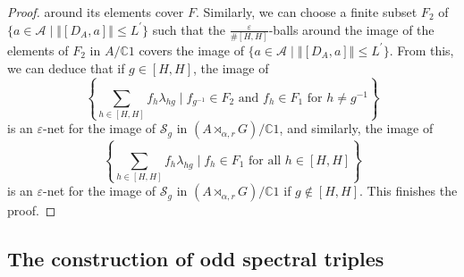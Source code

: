 \documentclass[a4paper,11pt,reqno]{amsart}
\numberwithin{equation}{section}
\numberwithin{equation}{section}
\theoremstyle{definition}
\theoremstyle{remark}
\theoremstyle{remark}
\begin{document}
\begin{proof}
around its elements cover $F$. Similarly, we can choose a finite subset
$F_{2}$ of $\{a\in\mathcal{A}\mid\left\Vert [D_{A},a]\right\Vert \leq L^\prime \}$
such that the $\frac{\varepsilon}{\#[H,H]}$-balls around the image
of the elements of $F_{2}$ in $A/\mathbb{C}1$ covers the image of
$\{a\in\mathcal{A}\mid\left\Vert [D_{A},a]\right\Vert \leq L^\prime\}$. From
this, we can deduce that if $g\in[H,H]$, the image of 
\[
\left\{ \sum_{h\in[H,H]}f_{h}\lambda_{hg}\mid f_{g^{-1}}\in F_{2}\text{ and }f_{h}\in F_{1}\text{ for }h\neq g^{-1}\right\} 
\]
is an $\varepsilon$-net for the image of $\mathcal{S}_{g}$ in $(A\rtimes_{\alpha,r}G)/\mathbb{C}1$,
and similarly, the image of 
\[
\left\{ \sum_{h\in[H,H]}f_{h}\lambda_{hg}\mid f_{h}\in F_{1}\text{ for all }h\in[H,H]\right\} 
\]
is an $\varepsilon$-net for the image of $\mathcal{S}_{g}$ in $(A\rtimes_{\alpha,r}G)/\mathbb{C}1$
if $g\notin[H,H]$. This finishes the proof. \end{proof}

\vspace{3mm}


\subsection{The construction of odd spectral triples\label{ConverseCase}}
\end{document}
